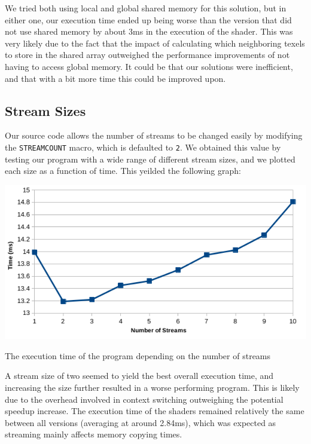 \documentclass[10pt,journal,compsoc]{IEEEtran}
\def\code#1{\texttt{#1}}
\begin{document}
\noindent We tried both using local and global shared memory for this solution, but in either one, our execution time ended up being worse than the version that did not use shared memory by about 3ms in the execution of the shader. This was very likely due to the fact that the impact of calculating which neighboring texels to store in the shared array outweighed the performance improvements of not having to access global memory. It could be that our solutions were inefficient, and that with a bit more time this could be improved upon.


\subsection{Stream Sizes}

\noindent Our source code allows the number of streams to be changed easily by modifying the \code{STREAMCOUNT} macro, which is defaulted to \code{2}. We obtained this value by testing our program with a wide range of different stream sizes, and we plotted each size as a function of time. This yeilded the following graph:

\begin{center}
  \captionsetup{type=figure}
  \includegraphics[width=\linewidth]{streamnumber.png}
  \caption {The execution time of the program depending on the number of streams}
  \label{fig:streamnumber}
\end{center}

\noindent A stream size of two seemed to yield the best overall execution time, and increasing the size further resulted in a worse performing program. This is likely due to the overhead involved in context switching outweighing the potential speedup increase. The execution time of the shaders remained relatively the same between all versions (averaging at around 2.84ms), which was expected as streaming mainly affects memory copying times.
\end{document}
